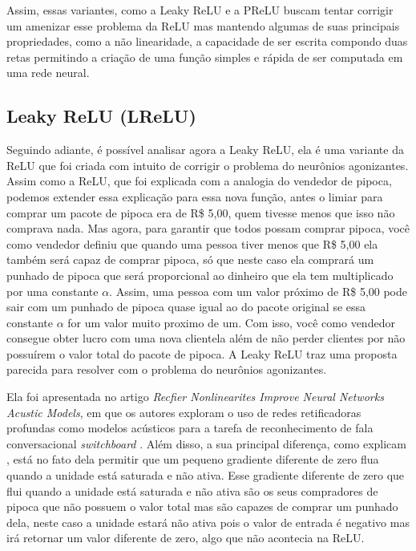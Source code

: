 Assim, essas variantes, como a Leaky ReLU e a PReLU buscam tentar corrigir um amenizar esse problema da ReLU mas mantendo algumas de suas principais propriedades, como a não linearidade, a capacidade de ser escrita compondo duas retas permitindo a criação de uma função simples e rápida de ser computada em uma rede neural.

\subsection{Leaky ReLU (LReLU)}

Seguindo adiante, é possível analisar agora a Leaky ReLU, ela é uma variante da ReLU que foi criada com intuito de corrigir o problema do neurônios agonizantes. Assim como a ReLU, que foi explicada com a analogia do vendedor de pipoca, podemos extender essa explicação para essa nova função, antes o limiar para comprar um pacote de pipoca era de R\$ 5,00, quem tivesse menos que isso não comprava nada. Mas agora, para garantir que todos possam comprar pipoca, você como vendedor definiu que quando uma pessoa tiver menos que R\$ 5,00 ela também será capaz de comprar pipoca, só que neste caso ela comprará um punhado de pipoca que será proporcional ao dinheiro que ela tem multiplicado por uma constante $\alpha$. Assim, uma pessoa com um valor próximo de R\$ 5,00 pode sair com um punhado de pipoca quase igual ao do pacote original se essa constante $\alpha$ for um valor muito proximo de um. Com isso, você como vendedor consegue obter lucro com uma nova clientela além de não perder clientes por não possuírem o valor total do pacote de pipoca. A Leaky ReLU traz uma proposta parecida para resolver com o problema do neurônios agonizantes.

Ela foi apresentada no artigo \textit{Recfier Nonlinearites Improve Neural Networks Acustic Models}, em que os autores exploram o uso de redes retificadoras profundas como modelos acústicos para a tarefa de reconhecimento de fala conversacional \textit{switchboard} \parencite{LeakyReLUArticle}. Além disso, a sua principal diferença, como explicam \textcite{LeakyReLUArticle}, está no fato dela permitir que um pequeno gradiente diferente de zero flua quando a unidade está saturada e não ativa. Esse gradiente diferente de zero que flui quando a unidade está saturada e não ativa são os seus compradores de pipoca que não possuem o valor total mas são capazes de comprar um punhado dela, neste caso a unidade estará não ativa pois o valor de entrada é negativo mas irá retornar um valor diferente de zero, algo que não acontecia na ReLU.

